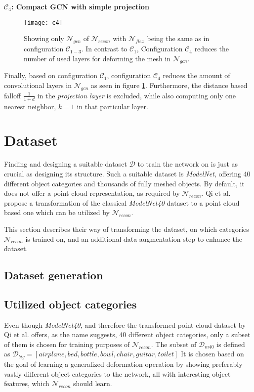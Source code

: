 \textbf{$\mathcal{C}_4$: Compact GCN with simple projection}
\begin{figure}
   \begin{center}
   \texttt{[image: c4]}
   \caption{Showing only $\mathcal{N}_{gcn}$ of $\mathcal{N}_{recon}$ with $\mathcal{N}_{flex}$ being the same
    as in configuration $\mathcal{C}_{1-3}$. In contrast to $\mathcal{C}_1$, Configuration $\mathcal{C}_4$ reduces 
    the number of used layers for deforming the mesh in $\mathcal{N}_{gcn}$.}
   \label{fig:c4}
   \end{center}
\end{figure}
Finally, based on configuration $\mathcal{C}_1$, configuration $\mathcal{C}_4$ reduces the amount of convolutional layers in $\mathcal{N}_{gcn}$ as seen in figure \ref{fig:c4}.
Furthermore, the distance based falloff $\frac{1}{1+d}$ in the \emph{projection layer} is excluded, 
while also computing only one nearest neighbor, $k=1$ in that particular layer. 

\section{Dataset}
\label{dataset}
   Finding and designing a suitable dataset $\mathcal{D}$
   to train the network on is just as crucial as designing its structure. 
   Such a suitable dataset is \emph{ModelNet}, offering 40 different object 
   categories and thousands of fully meshed objects. By default, it does not offer a
   point cloud representation, as required by $\mathcal{N}_{recon}$. Qi et al.
   \cite{qi2017pointnetplusplus} propose a transformation of the classical \emph{ModelNet40}
   dataset to a point cloud based one which can be utilized by $\mathcal{N}_{recon}$.

   This section describes their way of transforming the dataset, on which categories
   $\mathcal{N}_{recon}$ is trained on, and an additional data augmentation step to
   enhance the dataset.

\subsection{Dataset generation}
\subsection{Utilized object categories}
\label{sec:categ}
Even though \emph{ModelNet40}, and therefore the transformed point cloud dataset by Qi et al. offers, as the name suggests,
40 different object categories, only a subset of them is chosen for training purposes of $\mathcal{N}_{recon}$. 
The subset of $\mathcal{D}_{m40}$ is defined as $\mathcal{D}_{big}=[airplane,bed,bottle,bowl,chair,guitar,toilet]$
It is chosen based on the goal of learning a generalized deformation operation by showing preferably vastly different object categories
to the network, all with interesting object features, which $\mathcal{N}_{recon}$ should learn.

